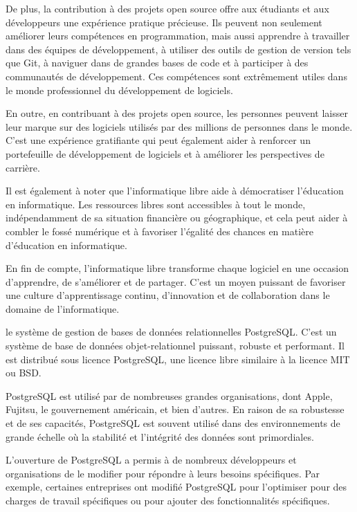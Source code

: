 De plus, la contribution à des projets open source offre aux étudiants et aux développeurs une expérience pratique précieuse. Ils peuvent non seulement améliorer leurs compétences en programmation, mais aussi apprendre à travailler dans des équipes de développement, à utiliser des outils de gestion de version tels que Git, à naviguer dans de grandes bases de code et à participer à des communautés de développement. Ces compétences sont extrêmement utiles dans le monde professionnel du développement de logiciels.

En outre, en contribuant à des projets open source, les personnes peuvent laisser leur marque sur des logiciels utilisés par des millions de personnes dans le monde. C'est une expérience gratifiante qui peut également aider à renforcer un portefeuille de développement de logiciels et à améliorer les perspectives de carrière.

Il est également à noter que l'informatique libre aide à démocratiser l'éducation en informatique. Les ressources libres sont accessibles à tout le monde, indépendamment de sa situation financière ou géographique, et cela peut aider à combler le fossé numérique et à favoriser l'égalité des chances en matière d'éducation en informatique.

En fin de compte, l'informatique libre transforme chaque logiciel en une occasion d'apprendre, de s'améliorer et de partager. C'est un moyen puissant de favoriser une culture d'apprentissage continu, d'innovation et de collaboration dans le domaine de l'informatique.

 le système de gestion de bases de données relationnelles PostgreSQL. C'est un système de base de données objet-relationnel puissant, robuste et performant. Il est distribué sous licence PostgreSQL, une licence libre similaire à la licence MIT ou BSD.

PostgreSQL est utilisé par de nombreuses grandes organisations, dont Apple, Fujitsu, le gouvernement américain, et bien d'autres. En raison de sa robustesse et de ses capacités, PostgreSQL est souvent utilisé dans des environnements de grande échelle où la stabilité et l'intégrité des données sont primordiales.

L'ouverture de PostgreSQL a permis à de nombreux développeurs et organisations de le modifier pour répondre à leurs besoins spécifiques. Par exemple, certaines entreprises ont modifié PostgreSQL pour l'optimiser pour des charges de travail spécifiques ou pour ajouter des fonctionnalités spécifiques.

